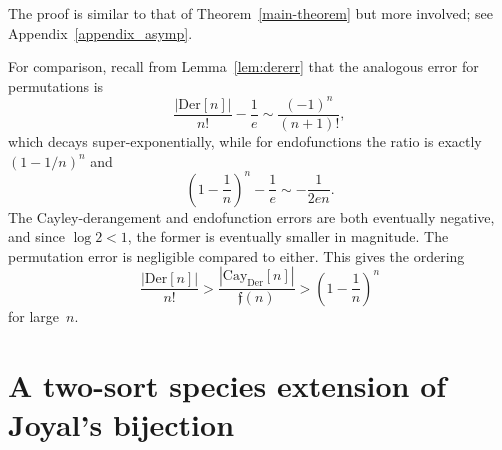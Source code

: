 \documentclass[a4paper,11pt,UKenglish]{article}
\newcommand{\Der}{\mathrm{Der}}
\newcommand{\Cay}{\mathrm{Cay}}
\newcommand{\fub}[1]{\mathfrak{f}(#1)}
\newcommand{\CayDer}{\Cay_{\Der}}
\theoremstyle{definition}
\begin{document}
The proof is similar to that of Theorem~\ref{main-theorem}
but more involved; see Appendix~\ref{appendix_asymp}.

For comparison, recall from Lemma~\ref{lem:dererr} that the analogous
error for permutations is
\[
  \frac{|\Der[n]|}{n!} - \frac{1}{e} \sim \frac{(-1)^{n}}{(n+1)!},
\]
which decays super-exponentially, while for endofunctions the ratio is
exactly $(1-1/n)^n$ and
\[
  \left(1-\frac{1}{n}\right)^n - \frac{1}{e} \sim -\frac{1}{2en}.
\]
The Cayley-derangement and endofunction errors are both eventually negative, and
since $\log 2 < 1$, the former is eventually smaller in magnitude. The permutation
error is negligible compared to either. This gives the ordering
\[
  \frac{|\Der[n]|}{n!} > \frac{|\CayDer[n]|}{\fub{n}} > \left(1-\frac{1}{n}\right)^n
\]
for large~$n$.

\section{A two-sort species extension of Joyal's bijection}\label{section_Joyal}
\end{document}
